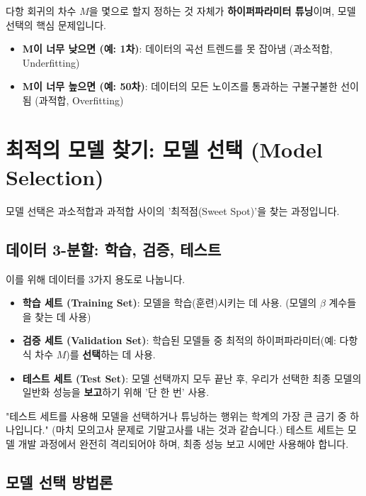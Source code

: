 \documentclass[11pt,a4paper]{book}
\theoremstyle{definition}
\begin{document}
다항 회귀의 차수 $M$을 몇으로 할지 정하는 것 자체가 \textbf{하이퍼파라미터 튜닝}이며, 모델 선택의 핵심 문제입니다.
\begin{itemize}
    \item \textbf{M이 너무 낮으면 (예: 1차)}: 데이터의 곡선 트렌드를 못 잡아냄 (과소적합, Underfitting)
    \item \textbf{M이 너무 높으면 (예: 50차)}: 데이터의 모든 노이즈를 통과하는 구불구불한 선이 됨 (과적합, Overfitting)
\end{itemize}


\section{최적의 모델 찾기: 모델 선택 (Model Selection)}

모델 선택은 과소적합과 과적합 사이의 '최적점(Sweet Spot)'을 찾는 과정입니다.

\subsection{데이터 3-분할: 학습, 검증, 테스트}

이를 위해 데이터를 3가지 용도로 나눕니다.
\begin{tcolorbox}[title={데이터의 3가지 역할}]
    \begin{itemize}
        \item \textbf{학습 세트 (Training Set)}: 모델을 학습(훈련)시키는 데 사용. (모델의 $\beta$ 계수들을 찾는 데 사용)
        \item \textbf{검증 세트 (Validation Set)}: 학습된 모델들 중 최적의 하이퍼파라미터(예: 다항식 차수 $M$)를 \textbf{선택}하는 데 사용.
        \item \textbf{테스트 세트 (Test Set)}: 모델 선택까지 모두 끝난 후, 우리가 선택한 최종 모델의 일반화 성능을 \textbf{보고}하기 위해 '단 한 번' 사용.
    \end{itemize}
\end{tcolorbox}

\begin{warningbox}[title=테스트 세트의 신성불가침 원칙]
"테스트 세트를 사용해 모델을 선택하거나 튜닝하는 행위는 학계의 가장 큰 금기 중 하나입니다." (마치 모의고사 문제로 기말고사를 내는 것과 같습니다.)
테스트 세트는 모델 개발 과정에서 완전히 격리되어야 하며, 최종 성능 보고 시에만 사용해야 합니다.
\end{warningbox}

\subsection{모델 선택 방법론}
\end{document}
